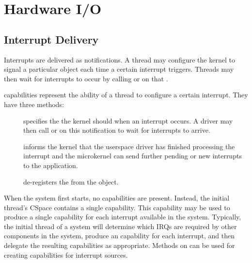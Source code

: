 %
%
%

\chapter{\label{ch:io}Hardware I/O}

\section{Interrupt Delivery}
\label{sec:interrupts}

Interrupts are delivered as notifications. A thread
may configure the kernel to signal a particular 
object each time a certain interrupt triggers. Threads may then wait for
interrupts to occur by calling  or
 on
that .


 capabilities represent the ability of a thread to
configure a certain interrupt. They have three methods:

\begin{description}
    \item[]
    specifies the  the kernel should
     when an interrupt occurs. A driver
    may then call  or 
    on this notification to
    wait for interrupts to arrive.

    \item[]
    informs the kernel that the userspace driver has finished processing
    the interrupt and the microkernel can send further pending or new
    interrupts to the application.

    \item[]
    de-registers the  from the  object.
\end{description}

When the system first starts, no  capabilities are
present. Instead, the initial thread's CSpace contains a single
 capability. This capability may be used to produce
a single  capability for each interrupt available in the
system. Typically, the initial thread of a system will determine which
IRQs are required by other components in the system, produce an
 capability for each interrupt, and then delegate the
resulting capabilities as appropriate. Methods on  can
be used for creating  capabilities for interrupt sources.

